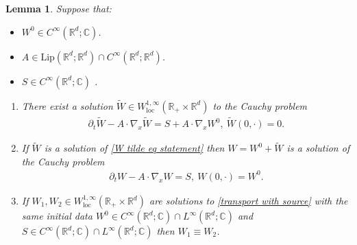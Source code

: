 \documentclass[10pt,a4paper]{amsart}
\newtheorem{lem}{Lemma}
\begin{document}
\begin{lem}\label{Duhamel principle}
Suppose that: 
\begin{itemize}
    \item $W^{0}\in C^{\infty}(\mathbb{R}^{d};\mathbb{C})$.
    \item $A \in \mathrm{Lip}(\mathbb{R}^{d};\mathbb{R}^{d})\cap C^{\infty}(\mathbb{R}^{d};\mathbb{R}^{d})$.
    \item $S\in C^{\infty}(\mathbb{R}^{d};\mathbb{C})$ . 
\end{itemize}
\begin{enumerate}
    \item There exist a solution $\widetilde{W}\in W^{1,\infty}_{\mathrm{loc}}(\mathbb{R}_{+}\times \mathbb{R}^{d})$ to the  Cauchy problem 
\begin{align}
\partial_{t}\widetilde{W}-A\cdot \nabla_{x}\widetilde{W}=S+A\cdot \nabla_{x}W^{\mathrm{0}}, \ \widetilde{W}(0,\cdot)=0. \label{W tilde eq statement} 
\end{align}
\item If $\widetilde{W}$ is a solution of \eqref{W tilde eq statement} then   $W=W^{0}+\widetilde{W}$ is a solution of the Cauchy problem 
\begin{align}
\partial_{t}W-A\cdot \nabla_{x}W=S,\ W(0,\cdot)=W^{0}. \label{transport with source}    
\end{align}
\item  If $W_{1},W_{2}\in W^
{1,\infty}_{\mathrm{loc}}(\mathbb{R}_{+}\times \mathbb{R}^{d})$ are solutions to \eqref{transport with source} with the same initial data $W^{0}\in C^{\infty}(\mathbb{R}^{d};\mathbb{C})\cap L^{\infty}(\mathbb{R}^{d};\mathbb{C})$ and $S\in C^{\infty}(\mathbb{R}^{d};\mathbb{C})\cap L^{\infty}(\mathbb{R}^{d};\mathbb{C})$ then $W_{1}\equiv W_{2}$. 
\end{enumerate}
\end{lem}
\end{document}
